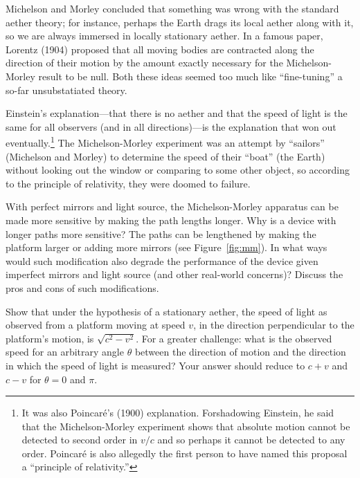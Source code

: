 Michelson and Morley concluded that something was wrong with the
standard aether theory; for instance, perhaps the Earth drags its
local aether along with it, so we are always immersed in locally
stationary aether.  In a famous paper, Lorentz (1904) proposed that
all moving bodies are contracted along the direction of their motion
by the amount exactly necessary for the Michelson-Morley result to be
null.  Both these ideas seemed too much like ``fine-tuning'' a so-far
unsubstatiated theory.

Einstein's explanation---that there is no aether and that the speed of
light is the same for all observers (and in all directions)---is the
explanation that won out eventually.\footnote{It was also Poincar\'e's
(1900) explanation.  Forshadowing Einstein, he said that the
Michelson-Morley experiment shows that absolute motion cannot be
detected to second order in $v/c$ and so perhaps it cannot be detected
to any order.  Poincar\'e is also allegedly the first person to have
named this proposal a ``principle of relativity.''}  The
Michelson-Morley experiment was an attempt by ``sailors'' (Michelson
and Morley) to determine the speed of their ``boat'' (the Earth)
without looking out the window or comparing to some other object, so
according to the principle of relativity, they were doomed to failure.

\begin{problem}
With perfect mirrors and light source, the Michelson-Morley apparatus
can be made more sensitive by making the path lengths longer.  Why is
a device with longer paths more sensitive?  The paths can be
lengthened by making the platform larger or adding more mirrors (see
Figure~\ref{fig:mm}).  In what ways would such modification also
degrade the performance of the device given imperfect mirrors and
light source (and other real-world concerns)?  Discuss the pros and
cons of such modifications.
\end{problem}

\begin{problem}
Show that under the hypothesis of a stationary aether, the speed of
light as observed from a platform moving at speed $v$, in the
direction perpendicular to the platform's motion, is $\sqrt{c^2-v^2}$.
For a greater challenge: what is the observed speed for an arbitrary
angle $\theta$ between the direction of motion and the direction in
which the speed of light is measured?  Your answer should reduce to
$c+v$ and $c-v$ for $\theta=0$ and $\pi$.
\end{problem}

